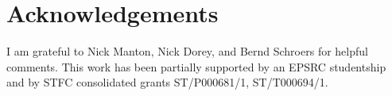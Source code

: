 \documentclass[10pt]{article}
\theoremstyle{definition}
\begin{document}
\section*{Acknowledgements}

I am grateful to Nick Manton, Nick Dorey, and Bernd Schroers for helpful comments. This work has been partially supported by an EPSRC studentship and by STFC consolidated grants ST/P000681/1, ST/T000694/1.











	
\end{document}
